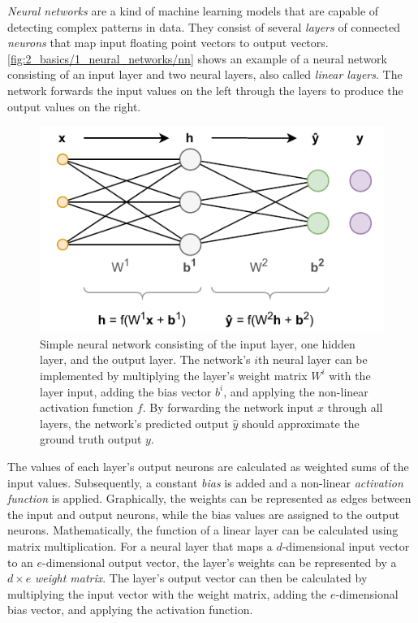 \emph{Neural networks} are a kind of machine learning models that are capable of detecting complex patterns in data. They consist of several \emph{layers} of connected \emph{neurons} that map input floating point vectors to output vectors. \autoref{fig:2_basics/1_neural_networks/nn} shows an example of a neural network consisting of an input layer and two neural layers, also called \emph{linear layers}. The network forwards the input values on the left through the layers to produce the output values on the right.

\begin{figure}[t]
    \centering
    \includegraphics{2_basics/1_neural_networks/nn}
    \caption{Simple neural network consisting of the input layer, one hidden layer, and the output layer. The network's $i$th neural layer can be implemented by multiplying the layer's weight matrix $W^i$ with the layer input, adding the bias vector $b^i$, and applying the non-linear activation function $f$. By forwarding the network input $x$ through all layers, the network's predicted output $\hat{y}$ should approximate the ground truth output $y$.}
    \label{fig:2_basics/1_neural_networks/nn}
\end{figure}

The values of each layer's output neurons are calculated as weighted sums of the input values. Subsequently, a constant \emph{bias} is added and a non-linear \emph{activation function} is applied. Graphically, the weights can be represented as edges between the input and output neurons, while the bias values are assigned to the output neurons. Mathematically, the function of a linear layer can be calculated using matrix multiplication. For a neural layer that maps a $d$-dimensional input vector to an $e$-dimensional output vector, the layer's weights can be represented by a $d \times e$ \emph{weight matrix}. The layer's output vector can then be calculated by multiplying the input vector with the weight matrix, adding the $e$-dimensional bias vector, and applying the activation function.

